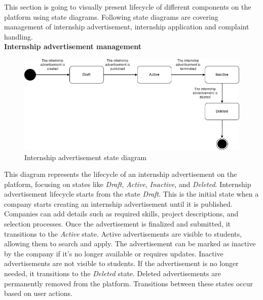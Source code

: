 \quad This section is going to visually present lifecycle of different components on the platform using state diagrams. Following state diagrams are covering management of internship advertisement, internship application and complaint handling. \\

\newpage
\textbf{Internship advertisement management}\\
\begin{figure}[H]
	\includegraphics[width=\textwidth,height=\textheight,keepaspectratio]{RASD-Latex/assets/state_diagram.png}
	\caption{Internship advertisement state diagram}
	\label{fig:DataRequest}
\end{figure}

This diagram represents the lifecycle of an internship advertisement on the platform, focusing on states like \textit{Draft}, \textit{Active}, \textit{Inactive}, and \textit{Deleted}. Internship advertisement lifecycle starts from the state \textit{Draft}. This is the initial state when a company starts creating an internship advertisement until it is published. Companies can add details such as required skills, project descriptions, and selection processes. Once the advertisement is finalized and submitted, it transitions to the \textit{Active} state. Active advertisements are visible to students, allowing them to search and apply. The advertisement can be marked as inactive by the company if it's no longer available or requires updates. Inactive advertisements are not visible to students. If the advertisement is no longer needed, it transitions to the \textit{Deleted} state. Deleted advertisements are permanently removed from the platform. Transitions between these states occur based on user actions.\\


